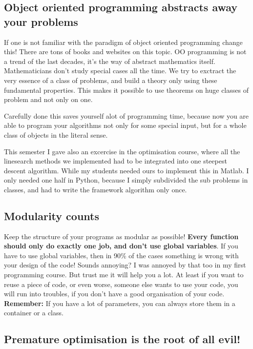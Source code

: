 \documentclass[letterpaper,10pt,english]{manual}
\begin{document}
\subsection{Object oriented programming abstracts away your problems}

If one is not familiar with the paradigm of object oriented programming change this!
There are tons of books and websites on this topic.
OO programming is not a trend of the last decades, it's the way of abstract mathematics itself.
Mathematicians don't study special cases all the time. We try to exctract the very essence of a class
of problems, and build a theory only using these fundamental properties. This makes it possible to
use theorems on huge classes of problem and not only on one.

Carefully done this saves yourself alot of programming time, because now you are able
to program your algorithms not only for some special input, but for a whole class of objects
in the literal sense.

This semester I gave also an excercise in the optimisation course, where
all the linesearch methods we implemented had to be integrated into one steepest descent algorithm.
While my students needed ours to implement this in Matlab. I only needed one half in Python, because
I simply subdivided the sub problems in classes, and had to write the framework algorithm only once.


\subsection{Modularity counts}

Keep the structure of your programs as modular as possible!
\textbf{Every function should only do exactly one job, and don't use
global variables}. If you have to use global variables, then in
90\% of the cases something is wrong with your design of the code!
Sounds annoying? I was annoyed by that too in my first programming
course. But trust me it will help you a lot. At least if you want to
reuse a piece of code, or even worse, someone else wants to use your
code, you will run into troubles, if you don't have a good
organisation of your code. \textbf{Remember:}  If you have a lot of
parameters, you can always store them in a container or a class.


\subsection{Premature optimisation is the root of all evil!}
\end{document}
